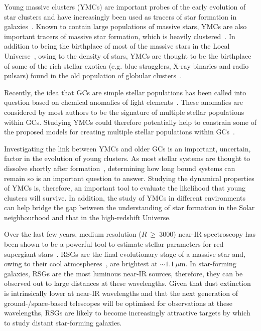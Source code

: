 \documentclass[useAMS,usenatbib]{mn2e}
\begin{document}
Young massive clusters (YMCs\footnotemark) are important probes of the early evolution of star clusters and have increasingly been used as tracers of star formation in galaxies~\citep[e.g.][]{1995AJ....109..960W,1997AJ....114.2381M,1999AJ....118..752Z}.
Known to contain large populations of massive stars, YMCs are also important tracers of massive star formation, which is heavily clustered~\citep{2003ARA&A..41...57L,2005A&A...437..247D,2007MNRAS.380.1271P}.
In addition to being the birthplace of most of the massive stars in the Local Universe~\citep[$>200\,$M$_{\odot}$ stars in R136;][]{2010MNRAS.408..731C}, owing to the density of stars, YMCs are thought to be the birthplace of some of the rich stellar exotica
(e.g. blue stragglers, X-ray binaries and radio pulsars) found in the old population of globular clusters~\citep[GCs;][]{2010ARA&A..48..431P}.


Recently, the idea that GCs are simple stellar populations has been called into question based on chemical anomalies of light elements~\citep[C, N, O, Na and Al; e.g.][]{2012A&ARv..20...50G}.
These anomalies are considered by most authors to be the signature of multiple stellar populations within GCs.
Studying YMCs could therefore potentially help to constrain some of the proposed models for creating multiple stellar populations within GCs~\citep[e.g.][]{2014MNRAS.441.2754C}.

Investigating the link between YMCs and older GCs is an important, uncertain, factor in the evolution of young clusters.
As most stellar systems are thought to dissolve shortly after formation~\citep{2003ARA&A..41...57L}, determining how long bound systems can remain so is an important question to answer.
Studying the dynamical properties of YMCs is, therefore, an important tool to evaluate the likelihood that young clusters will survive.
In addition, the study of YMCs in different environments can help bridge the gap between the understanding of star formation in the Solar neighbourhood and that in the high-redshift Universe.


Over the last few years, medium resolution ($R~\geq~3000$) near-IR spectroscopy has been shown to be a powerful tool to estimate stellar parameters for red supergiant stars~\citep[RSGs;][]{2010MNRAS.407.1203D}.
RSGs are the final evolutionary stage of a massive star and, owing to their cool atmospheres~\citep[T$_{\rm eff}\sim$~4000\,K;][]{2013ApJ...767....3D}, are brightest at $\sim1.1\,\mu$m.
In star-forming galaxies, RSGs are the most luminous near-IR sources, therefore, they can be observed out to large distances at these wavelengths.
Given that dust extinction is intrinsically lower at near-IR wavelengths and that the next generation of ground-/space-based telescopes will be optimised for observations at these wavelengths, RSGs are likely to become increasingly attractive targets by which to study distant star-forming galaxies.
\end{document}
